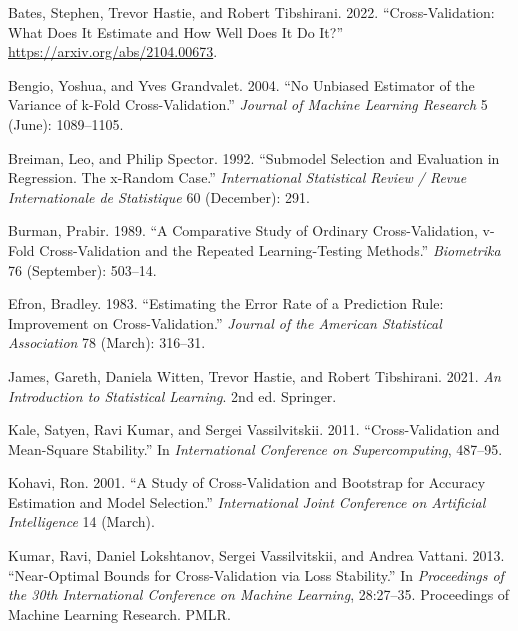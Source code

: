 \documentclass[
  12pt,
]{article}
\newlength{\cslhangindent}
\newlength{\cslentryspacingunit} %
\newenvironment{CSLReferences}[2] %
 {%
  \setlength{\parindent}{0pt}
  \ifodd #1
  \let\oldpar\par
  \def\par{\hangindent=\cslhangindent\oldpar}
  \fi
  \setlength{\parskip}{#2\cslentryspacingunit}
 }%
 {}
\begin{document}
\hypertarget{refs}{}
\begin{CSLReferences}{1}{0}
\leavevmode{}%
Bates, Stephen, Trevor Hastie, and Robert Tibshirani. 2022.
{``Cross-Validation: What Does It Estimate and How Well Does It Do
It?''} \url{https://arxiv.org/abs/2104.00673}.

\leavevmode{}%
Bengio, Yoshua, and Yves Grandvalet. 2004. {``No Unbiased Estimator of
the Variance of k-Fold Cross-Validation.''} \emph{Journal of Machine
Learning Research} 5 (June): 1089--1105.

\leavevmode{}%
Breiman, Leo, and Philip Spector. 1992. {``Submodel Selection and
Evaluation in Regression. The x-Random Case.''} \emph{International
Statistical Review / Revue Internationale de Statistique} 60 (December):
291.

\leavevmode{}%
Burman, Prabir. 1989. {``A Comparative Study of Ordinary
Cross-Validation, v-Fold Cross-Validation and the Repeated
Learning-Testing Methods.''} \emph{Biometrika} 76 (September): 503--14.

\leavevmode{}%
Efron, Bradley. 1983. {``Estimating the Error Rate of a Prediction Rule:
Improvement on Cross-Validation.''} \emph{Journal of the American
Statistical Association} 78 (March): 316--31.

\leavevmode{}%
James, Gareth, Daniela Witten, Trevor Hastie, and Robert Tibshirani.
2021. \emph{An Introduction to Statistical Learning}. 2nd ed. Springer.

\leavevmode{}%
Kale, Satyen, Ravi Kumar, and Sergei Vassilvitskii. 2011.
{``Cross-Validation and Mean-Square Stability.''} In \emph{International
Conference on Supercomputing}, 487--95.

\leavevmode{}%
Kohavi, Ron. 2001. {``A Study of Cross-Validation and Bootstrap for
Accuracy Estimation and Model Selection.''} \emph{International Joint
Conference on Artificial Intelligence} 14 (March).

\leavevmode{}%
Kumar, Ravi, Daniel Lokshtanov, Sergei Vassilvitskii, and Andrea
Vattani. 2013. {``Near-Optimal Bounds for Cross-Validation via Loss
Stability.''} In \emph{Proceedings of the 30th International Conference
on Machine Learning}, 28:27--35. Proceedings of Machine Learning
Research. PMLR.


\end{CSLReferences}
\end{document}
